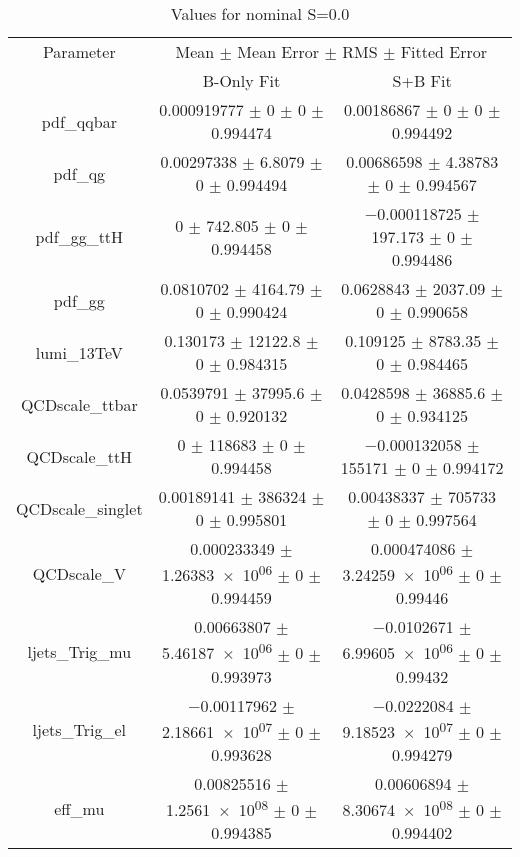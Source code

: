 \begin{table}
\centering
\caption{Values for nominal S=0.0}
\begin{tabular}{ccc}
\toprule
Parameter & \multicolumn{2}{c}{Mean $\pm$ Mean Error $\pm$ RMS $\pm$ Fitted Error}\\
 & B-Only Fit & S+B Fit\\
\midrule
pdf\_qqbar & \num{0.000919777} $\pm$ \num{0} $\pm$ \num{0} $\pm$ \num{0.994474} & \num{0.00186867} $\pm$ \num{0} $\pm$ \num{0} $\pm$ \num{0.994492}\\
pdf\_qg & \num{0.00297338} $\pm$ \num{6.8079} $\pm$ \num{0} $\pm$ \num{0.994494} & \num{0.00686598} $\pm$ \num{4.38783} $\pm$ \num{0} $\pm$ \num{0.994567}\\
pdf\_gg\_ttH & \num{0} $\pm$ \num{742.805} $\pm$ \num{0} $\pm$ \num{0.994458} & \num{-0.000118725} $\pm$ \num{197.173} $\pm$ \num{0} $\pm$ \num{0.994486}\\
pdf\_gg & \num{0.0810702} $\pm$ \num{4164.79} $\pm$ \num{0} $\pm$ \num{0.990424} & \num{0.0628843} $\pm$ \num{2037.09} $\pm$ \num{0} $\pm$ \num{0.990658}\\
lumi\_13TeV & \num{0.130173} $\pm$ \num{12122.8} $\pm$ \num{0} $\pm$ \num{0.984315} & \num{0.109125} $\pm$ \num{8783.35} $\pm$ \num{0} $\pm$ \num{0.984465}\\
QCDscale\_ttbar & \num{0.0539791} $\pm$ \num{37995.6} $\pm$ \num{0} $\pm$ \num{0.920132} & \num{0.0428598} $\pm$ \num{36885.6} $\pm$ \num{0} $\pm$ \num{0.934125}\\
QCDscale\_ttH & \num{0} $\pm$ \num{118683} $\pm$ \num{0} $\pm$ \num{0.994458} & \num{-0.000132058} $\pm$ \num{155171} $\pm$ \num{0} $\pm$ \num{0.994172}\\
QCDscale\_singlet & \num{0.00189141} $\pm$ \num{386324} $\pm$ \num{0} $\pm$ \num{0.995801} & \num{0.00438337} $\pm$ \num{705733} $\pm$ \num{0} $\pm$ \num{0.997564}\\
QCDscale\_V & \num{0.000233349} $\pm$ \num{1.26383e+06} $\pm$ \num{0} $\pm$ \num{0.994459} & \num{0.000474086} $\pm$ \num{3.24259e+06} $\pm$ \num{0} $\pm$ \num{0.99446}\\
ljets\_Trig\_mu & \num{0.00663807} $\pm$ \num{5.46187e+06} $\pm$ \num{0} $\pm$ \num{0.993973} & \num{-0.0102671} $\pm$ \num{6.99605e+06} $\pm$ \num{0} $\pm$ \num{0.99432}\\
ljets\_Trig\_el & \num{-0.00117962} $\pm$ \num{2.18661e+07} $\pm$ \num{0} $\pm$ \num{0.993628} & \num{-0.0222084} $\pm$ \num{9.18523e+07} $\pm$ \num{0} $\pm$ \num{0.994279}\\
eff\_mu & \num{0.00825516} $\pm$ \num{1.2561e+08} $\pm$ \num{0} $\pm$ \num{0.994385} & \num{0.00606894} $\pm$ \num{8.30674e+08} $\pm$ \num{0} $\pm$ \num{0.994402}\\

\end{tabular}
\end{table}
